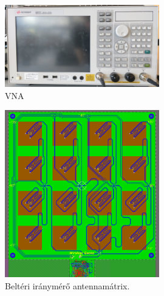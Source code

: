 %
            \begin{figure}
                \centering
                \includegraphics[width=0.6\textwidth]{kep/szerkesztett/vna.jpg}
                \caption{VNA}
                \label{fig:vna}
            \end{figure}
%
%
            \begin{figure}
                \centering
                \includegraphics[width=0.6\textwidth]{kep/szerkesztett/antennamatrix.png}
                \caption{Beltéri iránymérő antennamátrix.}
                \label{fig:antennamatrix}
            \end{figure}
%

